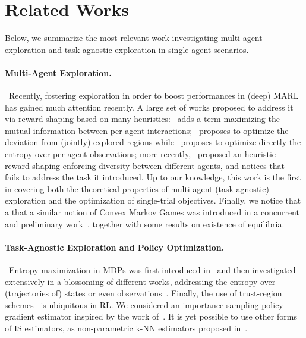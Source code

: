 \section{Related Works}
\label{sec:relatedworks}

Below, we summarize the most relevant work investigating multi-agent exploration and task-agnostic exploration in single-agent scenarios.
\vspace{-9pt}
\paragraph*{Multi-Agent Exploration.}~Recently, fostering exploration in order to boost performances in (deep) MARL has gained much attention recently. A large set of works proposed to address it via reward-shaping based on many heuristics:~\citet{wang2019influence} adds a term maximizing the mutual-information between per-agent interactions;~\citet{zhang2021made} proposes to optimize the deviation from (jointly) explored regions while~\citet{zhang2023self} proposes to optimize directly the entropy over per-agent observations; more recently,~\citet{xu2024population} proposed an heuristic reward-shaping enforcing diversity between different agents, and notices that~\citet{wang2019influence} fails to address the task it introduced. Up to our knowledge, this work is the first in covering both the theoretical properties of multi-agent (task-agnostic) exploration and the optimization of single-trial objectives. Finally, we notice that a that a similar notion of Convex Markov Games was introduced in a concurrent and preliminary work~\citep{gemp2025convexmarkovgamesframework}, together with some results on existence of equilibria.
\vspace{-9pt}
\paragraph*{Task-Agnostic Exploration and Policy Optimization.}~Entropy maximization in MDPs was first introduced in~\citet{hazan2019provably} and then investigated extensively in a blossoming of different works, addressing the entropy over (trajectories of) states or even observations~\citep[to name a few][]{jin2020sample, golowich2022planning, pmlr-v202-tiapkin23a, zamboni2024limits, savas2022entropy}. Finally, the use of trust-region schemes~\cite{schulman2017trustregionpolicyoptimization} is ubiquitous in RL. We considered an importance-sampling policy gradient estimator inspired by the work of~\citet{metelli2020pois}. It is yet possible to use other forms of IS estimators, as non-parametric k-NN estimators proposed in~\citet{muttirestelli2020}.

